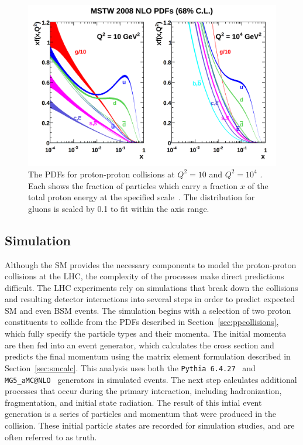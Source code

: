\begin{figure}
\includegraphics[width=\textwidth]{figures/pdfs.png}
\caption{The \acp{PDF} for proton-proton collisions at $Q^2 = 10$ \GeV{} and $Q^2 = 10^4$ \GeV{}. Each shows the fraction of particles which carry a fraction $x$ of the total proton energy at the specified scale~\cite{pdfs}. The distribution for gluons is scaled by 0.1 to fit within the axis range.}
\label{fig:pdfs}
\end{figure}

\subsection{Simulation}

Although the \ac{SM} provides the necessary components to model the proton-proton collisions at the \ac{LHC}, the complexity of the processes make direct predictions difficult.
The \ac{LHC} experiments rely on simulations that break down the collisions and resulting detector interactions into several steps in order to predict expected \ac{SM} and even \ac{BSM} events.
The simulation begins with a selection of two proton constituents to collide from the \acp{PDF} described in Section~\ref{sec:ppcollisions}, which fully specify the particle types and their momenta.
The initial momenta are then fed into an event generator, which calculates the cross section and predicts the final momentum using the matrix element formulation described in Section~\ref{sec:smcalc}.
This analysis uses both the \texttt{Pythia 6.4.27}~\cite{pythia6} and \texttt{MG5\_aMC@NLO}~\cite{madgraph} generators in simulated events.
The next step calculates additional processes that occur during the primary interaction, including hadronization, fragmentation, and initial state radiation. 
The result of this intial event generation is a series of particles and momentum that were produced in the collision.
These initial particle states are recorded for simulation studies, and are often referred to as truth.

